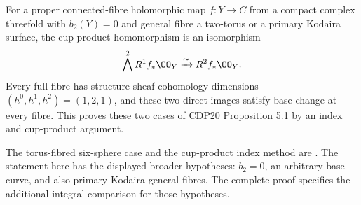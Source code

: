 \begin{proposition}\hypertarget{tag-01FX}{}\label{cdp:st:D.1.12}

For a proper connected-fibre holomorphic map $f:Y\to C$ from a
compact complex threefold with $b_2(Y)=0$ and general fibre a
two-torus or a primary Kodaira surface, the cup-product homomorphism
is an isomorphism
\[
\bigwedge^2R^1f_*\OO_Y\xrightarrow{\simeq}R^2f_*\OO_Y.
\]
Every full fibre has structure-sheaf cohomology dimensions
$(h^0,h^1,h^2)=(1,2,1)$, and these two direct images satisfy
base change at every fibre. This proves these two cases of CDP20
Proposition 5.1 by an index and cup-product argument.
\end{proposition}



The torus-fibred six-sphere case and the cup-product index method are \citet[Theorem~2.3, pp.~5--6]{Viaclovsky2026Combs}. The statement here has the displayed broader hypotheses: $b_2=0$, an arbitrary base curve, and also primary Kodaira general fibres. The complete proof specifies the additional integral comparison for those hypotheses.

